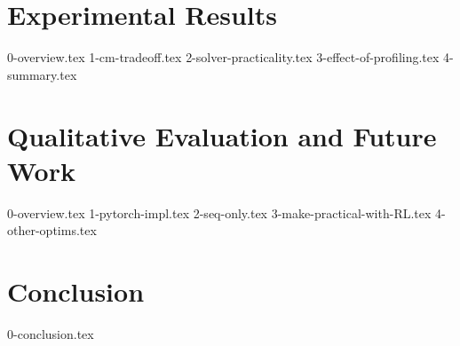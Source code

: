 \documentclass[12pt,twoside]{report}
\begin{document}
\chapter{Experimental Results} \label{ch:4-experiments}
{0-overview.tex}
{1-cm-tradeoff.tex}
{2-solver-practicality.tex}
{3-effect-of-profiling.tex}
{4-summary.tex}

\chapter{Qualitative Evaluation and Future Work}
{0-overview.tex}
{1-pytorch-impl.tex}
{2-seq-only.tex}
{3-make-practical-with-RL.tex}
{4-other-optims.tex}

\chapter{Conclusion}
{0-conclusion.tex}


\end{document}

